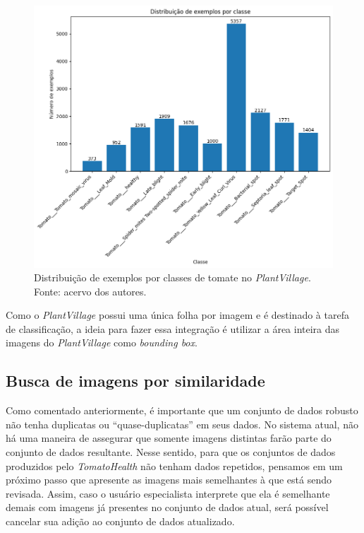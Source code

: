 \begin{figure}[H]
    \centering
    \includegraphics[width=0.9\linewidth]{images/plant_village_distribution.png}
    \caption{\label{fig:distribuicao_plantvillage} Distribuição de exemplos por classes de tomate no \emph{PlantVillage}. Fonte: acervo dos autores.}
\end{figure}

Como o \emph{PlantVillage} possui uma única folha por imagem e é destinado à tarefa de classificação, a ideia para fazer essa integração é utilizar a área inteira das imagens do \emph{PlantVillage} como \emph{bounding box}.

\subsection{Busca de imagens por similaridade}
Como comentado anteriormente, é importante que um conjunto de dados robusto não tenha duplicatas ou ``quase-duplicatas'' em seus dados. No sistema atual, não há uma maneira de assegurar que somente imagens distintas farão parte do conjunto de dados resultante. Nesse sentido, para que os conjuntos de dados produzidos pelo \emph{TomatoHealth} não tenham dados repetidos, pensamos em um próximo passo que apresente as imagens mais semelhantes à que está sendo revisada. Assim, caso o usuário especialista interprete que ela é semelhante demais com imagens já presentes no conjunto de dados atual, será possível cancelar sua adição ao conjunto de dados atualizado.

